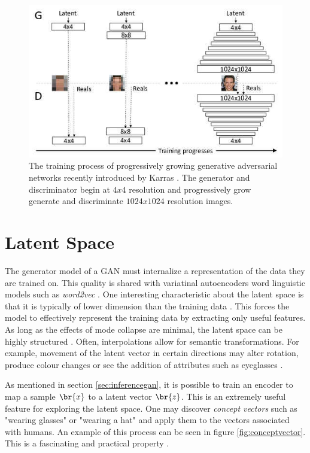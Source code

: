 \documentclass[11pt]{article}
\begin{document}
\begin{figure}
\centering
\includegraphics[scale=0.45]{progressive_growing}
\caption{The training process of progressively growing generative adversarial networks recently introduced by Karras  \citep{2017arXiv171010196K}. The generator and discriminator begin at $4x4$ resolution and progressively grow generate and discriminate $1024x1024$ resolution images.}
\label{fig:ProgressiveGrowingGAN}
\end{figure}

\section{Latent Space}
The generator model of a GAN must internalize a representation of the data they are trained on. This quality is shared with variatinal autoencoders word linguistic models such as \textit{word2vec} \citep{2017arXiv171007035C}. One interesting characteristic about the latent space is that it is typically of lower dimension than the training data \citep{2017arXiv171007035C}. This forces the model to effectively represent the training data by extracting only useful features. As long as the effects of mode collapse are minimal, the latent space can be highly structured \citep{2017arXiv171007035C}. Often, interpolations allow for semantic transformations. For example, movement of the latent vector in certain directions may alter rotation, produce colour changes or see the addition of attributes such as eyeglasses \citep{2017arXiv171007035C}.

As mentioned in section \ref{sec:inferencegan}, it is possible to train an encoder to map a sample $\br{x}$ to a latent vector $\br{z}$. This is an extremely useful feature for exploring the latent space. One may discover \textit{concept vectors} such as "wearing glasses" or "wearing a hat" and apply them to the vectors associated with humans. An example of this process can be seen in figure \ref{fig:conceptvector}. This is a fascinating and practical property \citep{2017arXiv171007035C}.
\end{document}
